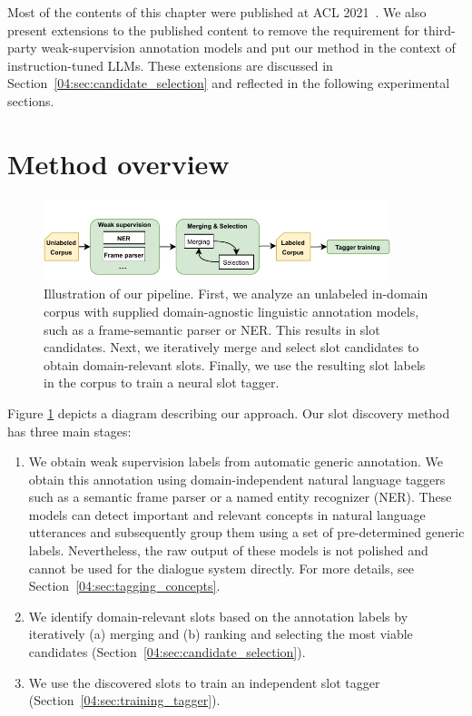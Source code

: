 Most of the contents of this chapter were published at ACL 2021~\cite{hudecek-etal-2021-discovering}.
We also present extensions to the published content to remove the requirement for third-party weak-supervision annotation models and put our method in the context of instruction-tuned LLMs.
These extensions are discussed in Section~\ref{04:sec:candidate_selection} and reflected in the following experimental sections.

\section{Method overview}
\label{04:sec:overview}
\begin{figure}[h]
    \centering
    \includegraphics[width=0.9\textwidth]{images/weakly-supervised.pdf}
    \caption{Illustration of our pipeline. First, we analyze an unlabeled in-domain corpus with supplied domain-agnostic linguistic annotation models, such as a frame-semantic parser or NER. This results in slot candidates. Next, we iteratively merge and select slot candidates to obtain domain-relevant slots. Finally, we use the resulting slot labels in the corpus to train a neural slot tagger.}
    \label{fig:discover_overall}
\end{figure}
Figure \ref{fig:discover_overall} depicts a diagram describing our approach.
Our slot discovery method has three main stages:
\begin{enumerate}
    \item We obtain weak supervision labels from automatic generic annotation.
    We obtain this annotation using domain-independent natural language taggers such as a semantic frame parser or a named entity recognizer (NER).
    These models can detect important and relevant concepts in natural language utterances and subsequently group them using a set of pre-determined generic labels.
    Nevertheless, the raw output of these models is not polished and cannot be used for the dialogue system directly.
    For more details, see Section~\ref{04:sec:tagging_concepts}.
    \item We identify domain-relevant slots based on the annotation labels by iteratively (a) merging and (b) ranking and selecting the most viable candidates (Section~\ref{04:sec:candidate_selection}).
    
    \item We use the discovered slots to train an independent slot tagger (Section~\ref{04:sec:training_tagger}).
\end{enumerate}

